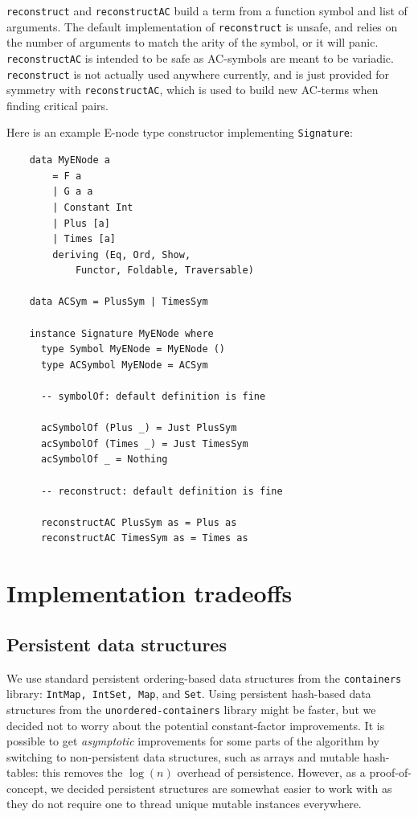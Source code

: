 \documentclass[12pt,a4paper,twoside,openright]{report}
\numberwithin{equation}{chapter}		%
\numberwithin{figure}{chapter}			%
\numberwithin{table}{chapter}			%
\theoremstyle{definition}
\theoremstyle{plain}
\begin{document}
\texttt{reconstruct} and \texttt{reconstructAC} build a term from a function symbol and list of arguments. The default implementation of \texttt{reconstruct} is unsafe, and relies on the number of arguments to match the arity of the symbol, or it will panic. \texttt{reconstructAC} is intended to be safe as AC-symbols are meant to be variadic. \texttt{reconstruct} is not actually used anywhere currently, and is just provided for symmetry with \texttt{reconstructAC}, which is used to build new AC-terms when finding critical pairs.

Here is an example E-node type constructor implementing \texttt{Signature}:

\begin{verbatim}
	data MyENode a
		= F a
		| G a a
		| Constant Int
		| Plus [a]
		| Times [a]
		deriving (Eq, Ord, Show,
			Functor, Foldable, Traversable)
		
	data ACSym = PlusSym | TimesSym
		
	instance Signature MyENode where
	  type Symbol MyENode = MyENode ()
	  type ACSymbol MyENode = ACSym
	  
	  -- symbolOf: default definition is fine
	  
	  acSymbolOf (Plus _) = Just PlusSym
	  acSymbolOf (Times _) = Just TimesSym
	  acSymbolOf _ = Nothing
	  
	  -- reconstruct: default definition is fine
	  
	  reconstructAC PlusSym as = Plus as
	  reconstructAC TimesSym as = Times as
\end{verbatim}

\section{Implementation tradeoffs}
\subsection{Persistent data structures}
We use standard persistent ordering-based data structures from the \texttt{containers} library: \texttt{IntMap, IntSet, Map}, and \texttt{Set}. Using persistent hash-based data structures from the \texttt{unordered-containers} library might be faster, but we decided not to worry about the potential constant-factor improvements. It is possible to get \emph{asymptotic} improvements for some parts of the algorithm by switching to non-persistent data structures, such as arrays and mutable hash-tables: this removes the $\log(n)$ overhead of persistence. However, as a proof-of-concept, we decided persistent structures are somewhat easier to work with as they do not require one to thread unique mutable instances everywhere.
\end{document}
